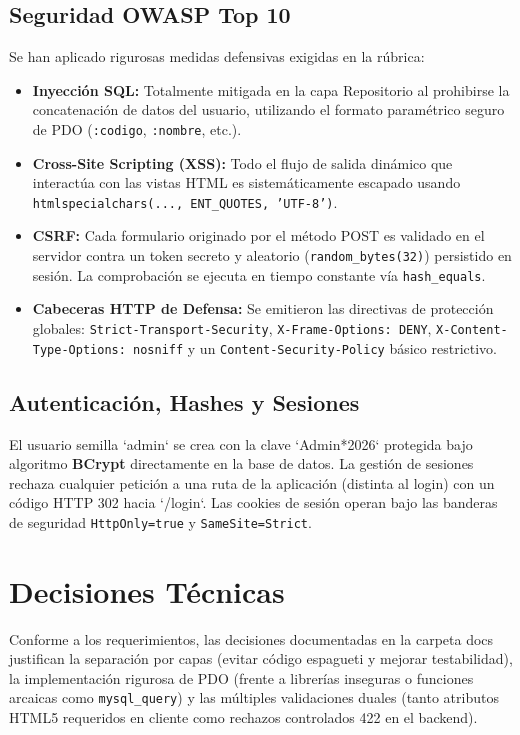 \documentclass[12pt]{article}
\begin{document}
\subsection{Seguridad OWASP Top 10}
Se han aplicado rigurosas medidas defensivas exigidas en la rúbrica:
\begin{itemize}
    \item \textbf{Inyección SQL:} Totalmente mitigada en la capa Repositorio al prohibirse la concatenación de datos del usuario, utilizando el formato paramétrico seguro de PDO (\texttt{:codigo}, \texttt{:nombre}, etc.).
    \item \textbf{Cross-Site Scripting (XSS):} Todo el flujo de salida dinámico que interactúa con las vistas HTML es sistemáticamente escapado usando \texttt{htmlspecialchars(..., ENT\_QUOTES, 'UTF-8')}.
    \item \textbf{CSRF:} Cada formulario originado por el método POST es validado en el servidor contra un token secreto y aleatorio (\texttt{random\_bytes(32)}) persistido en sesión. La comprobación se ejecuta en tiempo constante vía \texttt{hash\_equals}.
    \item \textbf{Cabeceras HTTP de Defensa:} Se emitieron las directivas de protección globales: \texttt{Strict-Transport-Security}, \texttt{X-Frame-Options: DENY}, \texttt{X-Content-Type-Options: nosniff} y un \texttt{Content-Security-Policy} básico restrictivo.
\end{itemize}

\subsection{Autenticación, Hashes y Sesiones}
El usuario semilla `admin` se crea con la clave `Admin*2026` protegida bajo algoritmo \textbf{BCrypt} directamente en la base de datos. La gestión de sesiones rechaza cualquier petición a una ruta de la aplicación (distinta al login) con un código HTTP 302 hacia `/login`. Las cookies de sesión operan bajo las banderas de seguridad \texttt{HttpOnly=true} y \texttt{SameSite=Strict}.

\section{Decisiones Técnicas}
Conforme a los requerimientos, las decisiones documentadas en la carpeta docs justifican la separación por capas (evitar código espagueti y mejorar testabilidad), la implementación rigurosa de PDO (frente a librerías inseguras o funciones arcaicas como \texttt{mysql\_query}) y las múltiples validaciones duales (tanto atributos HTML5 requeridos en cliente como rechazos controlados 422 en el backend).
\end{document}
